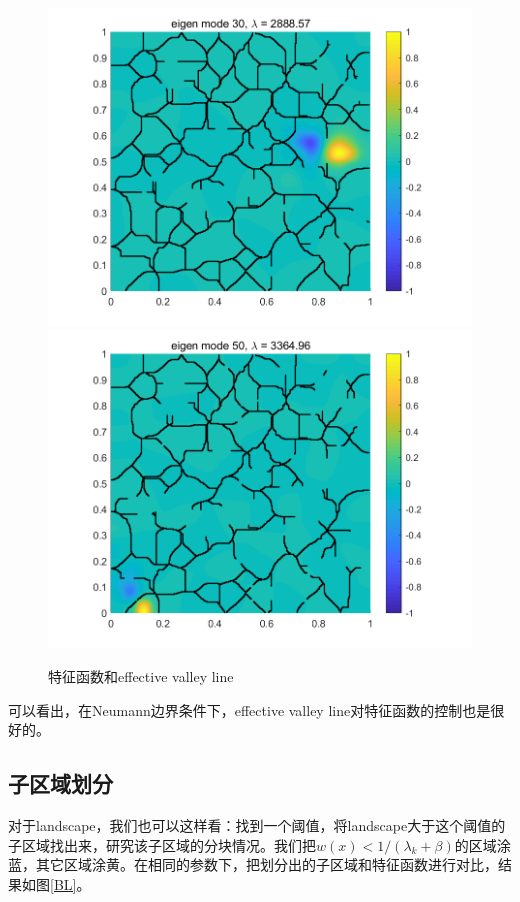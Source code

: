 \documentclass[12pt,a4paper]{article}
\begin{document}
\begin{figure}[htbp]
\includegraphics[width=0.3\linewidth]{valley/U(30)}
\includegraphics[width=0.3\linewidth]{valley/U(50)}
\caption{特征函数和effective valley line}
\label{VL2}
\end{figure}

可以看出，在Neumann边界条件下，effective valley line对特征函数的控制也是很好的。

\subsection{子区域划分}

对于landscape，我们也可以这样看：找到一个阈值，将landscape大于这个阈值的子区域找出来，研究该子区域的分块情况。我们把$w(x) < 1/(\lambda_k + \beta)$的区域涂蓝，其它区域涂黄。在相同的参数下，把划分出的子区域和特征函数进行对比，结果如图\ref{BL}。
\end{document}

